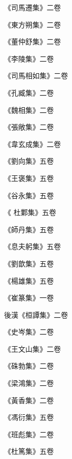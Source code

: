 \begin{pinyinscope}
 《司馬遷集》二卷



 《東方朔集》二卷



 《董仲舒集》二卷



 《李陵集》二卷



 《司馬相如集》二卷



 《孔臧集》二卷



 《魏相集》二卷



 《張敞集》二卷



 《韋玄成集》二卷



 《劉向集》五卷



 《王褒集》五卷



 《谷永集》五卷



 《
 杜鄴集》五卷



 《師丹集》五卷



 《息夫躬集》五卷



 《劉歆集》五卷



 《楊雄集》五卷



 《崔篆集》一卷



 後漢《桓譚集》二卷



 《史岑集》二卷



 《王文山集》二卷



 《硃勃集》二卷



 《梁鴻集》二卷



 《黃香集》二卷



 《馮衍集》五卷



 《班彪集》二卷



 《杜篤集》五卷




\end{pinyinscope}

